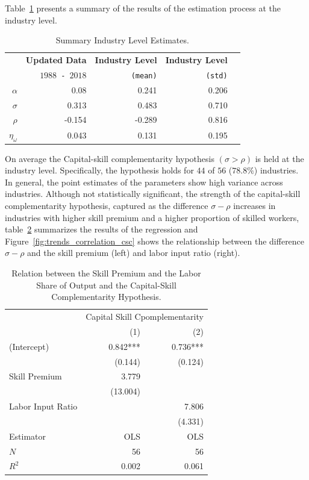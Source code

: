 \documentclass[12pt]{article}
\begin{document}
 Table~\ref{tab:estimation_ind} presents a summary of the results of the estimation process at the industry level. 
 \begin{table}[h]
 \begin{center}
 \begin{tabular}{rrrrr}
 \hline\hline
 & \textbf{Updated Data} & \textbf{Industry Level} & \textbf{Industry Level} \\
 & \texttt{$1988$ - $2018$} & \texttt{(mean)} & \texttt{(std)} \\\hline
 $\alpha$ & 0.08 & 0.241 & 0.206 \\
 $\sigma$ & 0.313 & 0.483 & 0.710\\
 $\rho$ & -0.154 & -0.289 & 0.816\\
 $\eta_\omega$& 0.043 & 0.131 & 0.195\\\hline\hline
\end{tabular}
\end{center}
\caption{\label{tab:estimation_ind} Summary Industry Level Estimates.}
\end{table}

On average the Capital-skill complementarity hypothesis $(\sigma > \rho)$ is held at the industry level.
Specifically, the hypothesis holds for $44$ of $56$ ($78.8\%$) industries. In general, the point estimates of the parameters show high variance across industries. Although not statistically significant, the strength of the capital-skill complementarity hypothesis, captured as the difference $\sigma - \rho$ increases in industries with higher skill premium and a higher proportion of skilled workers, table~\ref{tab:reg_csc} summarizes the results of the regression and Figure~\ref{fig:trends_correlation_csc} shows the relationship between the difference $\sigma - \rho$ and the skill premium (left) and labor input ratio (right).

\begin{table}[h]
 \begin{center}
\begin{tabular}{lrr}
 \toprule
 & \multicolumn{2}{c}{Capital Skill Cpomplementarity} \\ 
 \cmidrule(lr){2-3} 
 & (1) & (2) \\ 
 \midrule
 (Intercept) & 0.842*** & 0.736*** \\ 
 & (0.144) & (0.124) \\ 
 Skill Premium & 3.779 & \\ 
 & (13.004) & \\ 
 Labor Input Ratio & & 7.806 \\ 
 & & (4.331) \\ 
 \midrule
 Estimator & OLS & OLS \\ 
 \midrule
 $N$ & 56 & 56 \\ 
 $R^2$ & 0.002 & 0.061 \\ 
 \bottomrule
 \end{tabular}
\end{center}
\caption{\label{tab:reg_csc} Relation between the Skill Premium and the Labor Share of Output and the Capital-Skill Complementarity Hypothesis.}
\end{table}
\end{document}
